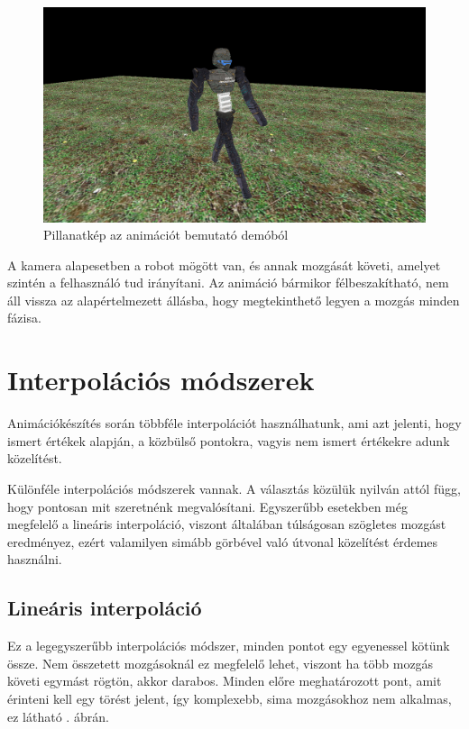 \begin{figure}[h]
\centering
\includegraphics[scale=0.4]{kepek/animation_demo.png}
\caption[]{Pillanatkép az animációt bemutató demóból}
\label{fig:anim_demo}
\end{figure}

A kamera alapesetben a robot mögött van, és annak mozgását követi, amelyet szintén a felhasználó tud irányítani. Az animáció bármikor félbeszakítható, nem áll vissza az alapértelmezett állásba, hogy megtekinthető legyen a mozgás minden fázisa.

\section{Interpolációs módszerek}

Animációkészítés során többféle interpolációt használhatunk, ami azt jelenti, hogy ismert értékek alapján, a közbülső pontokra, vagyis nem ismert értékekre adunk közelítést.

Különféle interpolációs módszerek vannak. A választás közülük nyilván attól függ, hogy pontosan mit szeretnénk megvalósítani. Egyszerűbb esetekben még megfelelő a lineáris interpoláció, viszont általában túlságosan szögletes mozgást eredményez, ezért valamilyen simább görbével való útvonal közelítést érdemes használni.

\subsection{Lineáris interpoláció}

Ez a legegyszerűbb interpolációs módszer, minden pontot egy egyenessel kötünk össze. Nem összetett mozgásoknál ez megfelelő lehet, viszont ha több mozgás követi egymást rögtön, akkor darabos. Minden előre meghatározott pont, amit érinteni kell egy törést jelent, így komplexebb, sima mozgásokhoz nem alkalmas, ez látható . ábrán.

